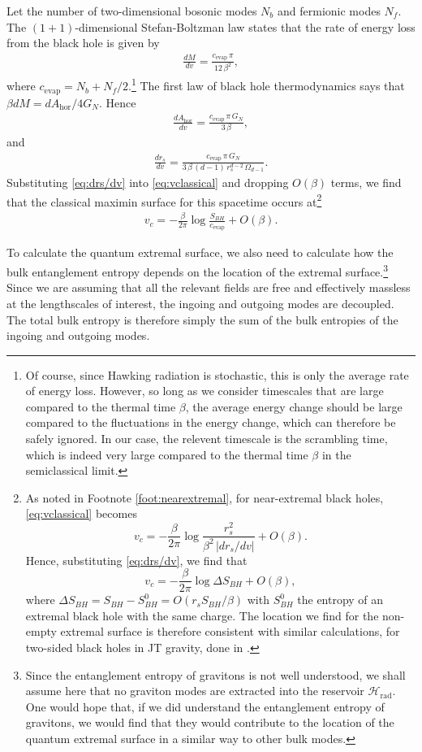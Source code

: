 \documentclass[12pt]{article}
\begin{document}
Let the number of two-dimensional bosonic modes $N_b$ and fermionic modes $N_f$. The $(1+1)$-dimensional Stefan-Boltzman law \cite{landsberg1989stefan} states that the rate of energy loss from the black hole is given by
\begin{align} \label{eq:energyflux}
\frac{d M}{d v} =  \frac{c_\text{evap}\, \pi}{12 \,\beta^2},
\end{align}
where $c_\text{evap} = N_b + N_f/2$.\footnote{Of course, since Hawking radiation is stochastic, this is only the average rate of energy loss. However, so long as we consider timescales that are large compared to the thermal time $\beta$, the average energy change should be large compared to the fluctuations in the energy change, which can therefore be safely ignored. In our case, the relevent timescale is the scrambling time, which is indeed very large compared to the thermal time $\beta$ in the semiclassical limit.} The first law of black hole thermodynamics says that $\beta dM = dA_\text{hor}/4G_N$. Hence
\begin{align} \label{eq:dAhor/dv}
\frac{d A_\text{hor}}{d v} = \frac{c_\text{evap}\, \pi \,G_N}{3\, \beta},
\end{align}
and
\begin{align} \label{eq:drs/dv}
\frac{d r_s}{d v} = \frac{c_\text{evap} \,\pi\, G_N}{3 \,\beta \,(d-1)\, r_s^{d-2}\, \Omega_{d-1}}.
\end{align}
Substituting \eqref{eq:drs/dv} into \eqref{eq:vclassical} and dropping $O(\beta)$ terms,  we find that the classical maximin surface for this spacetime occurs at\footnote{As noted in Footnote \ref{foot:nearextremal}, for near-extremal black holes, \eqref{eq:vclassical} becomes $$v_c = - \frac{\beta}{2\pi} \log \frac{r_s^2}{\beta^2\, |d r_s/d v|} + O(\beta).$$ Hence, substituting \eqref{eq:drs/dv}, we find that $$v_c = - \frac{\beta}{2\pi} \log \Delta S_{BH} + O(\beta),$$ where $\Delta S_{BH} = S_{BH} - S_{BH}^0 =  O(r_s S_{BH} / \beta)$ with $S_{BH}^0$ the entropy of an extremal black hole with the same charge. The location we find for the non-empty extremal surface is therefore consistent with similar calculations, for two-sided black holes in JT gravity, done in \cite{almheiri2019entropy}.}
\begin{align} \label{eq:vc}
v_c = -\frac{\beta}{2 \pi} \log \frac{S_{BH}}{c_\text{evap}} + O(\beta).
\end{align}

To calculate the quantum extremal surface, we also need to calculate how the bulk entanglement entropy depends on the location of the extremal surface.\footnote{Since the entanglement entropy of gravitons is not well understood, we shall assume here that no graviton modes are extracted into the reservoir $\mathcal{H}_\text{rad}$. One would hope that, if we did understand the entanglement entropy of gravitons, we would find that they would contribute to the location of the quantum extremal surface in a similar way to other bulk modes.} Since we are assuming that all the relevant fields are free and effectively massless at the lengthscales of interest, the ingoing and outgoing modes are decoupled. The total bulk entropy is therefore simply the sum of the bulk entropies of the ingoing and outgoing modes.
\end{document}
